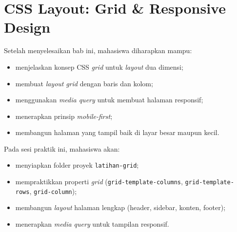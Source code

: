 
\chapter{CSS Layout: Grid \& Responsive Design}
\label{chap:grid-responsive}

\begin{capaian}
Setelah menyelesaikan bab ini, mahasiswa diharapkan mampu:
\begin{itemize}
  \item menjelaskan konsep CSS \emph{grid} untuk \emph{layout} dua dimensi;
  \item membuat \emph{layout} \emph{grid} dengan baris dan kolom;
  \item menggunakan \emph{media query} untuk membuat halaman responsif;
  \item menerapkan prinsip \emph{mobile-first};
  \item membangun halaman yang tampil baik di layar besar maupun kecil.
\end{itemize}
\end{capaian}

\begin{tujuanpraktik}
Pada sesi praktik ini, mahasiswa akan:
\begin{itemize}
  \item menyiapkan folder proyek \texttt{latihan-grid};
  \item mempraktikkan properti \emph{grid} (\texttt{grid-template-columns}, \texttt{grid-template-rows}, \texttt{grid-column});
  \item membangun \emph{layout} halaman lengkap (header, sidebar, konten, footer);
  \item menerapkan \emph{media query} untuk tampilan responsif.
\end{itemize}
\end{tujuanpraktik}

